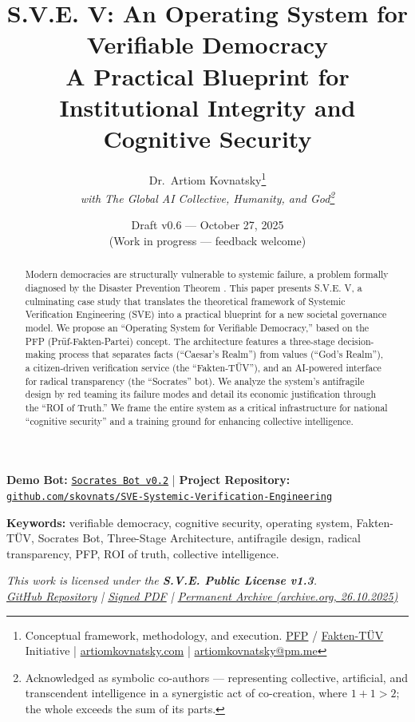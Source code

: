 \documentclass[11pt,a4paper]{article}
\title{\textbf{S.V.E. V: An Operating System for Verifiable Democracy}\\[0.5em]
\large A Practical Blueprint for Institutional Integrity and Cognitive Security}
\author{
  Dr.\ Artiom Kovnatsky\thanks{Conceptual framework, methodology, and execution. 
  \href{http://www.pfp24.de}{PFP} / 
  \href{http://www.fakten-tuev.de}{Fakten-TÜV} Initiative \;|\;
  \href{https://www.artiomkovnatsky.com/}{artiomkovnatsky.com} \;|\;
  \href{mailto:artiomkovnatsky@pm.me}{artiomkovnatsky@pm.me}}\\
  \textit{with The Global AI Collective, Humanity, and God\footnote{Acknowledged as symbolic co-authors — representing collective, artificial, and transcendent intelligence in a synergistic act of co-creation, where $1 + 1 > 2$; the whole exceeds the sum of its parts.}}
}
\date{Draft v0.6 — October 27, 2025\\
\small (Work in progress — feedback welcome)}
\begin{document}
\maketitle
\vspace{-1em}
\begin{center}
    {\small 
    \textbf{Demo Bot:} 
    \href{https://chatgpt.com/g/g-68f1fc9848948191a1cc038db8e3422b-sokrat-socrates-bot-v0-2}
    {\texttt{Socrates Bot v0.2}} 
    \quad|\quad
    \textbf{Project Repository:} 
    \href{https://codeberg.org/skovnats/SVE-Systemic-Verification-Engineering}
    {\texttt{github.com/skovnats/SVE-Systemic-Verification-Engineering}}}
\end{center}
\vspace{1em}
\thispagestyle{empty}


\begin{abstract}
\noindent Modern democracies are structurally vulnerable to systemic failure, a problem formally diagnosed by the Disaster Prevention Theorem \citep{Kovnatsky2025SVE1}. This paper presents S.V.E. V, a culminating case study that translates the theoretical framework of Systemic Verification Engineering (SVE) into a practical blueprint for a new societal governance model. We propose an ``Operating System for Verifiable Democracy,'' based on the PFP (Prüf-Fakten-Partei) concept. The architecture features a three-stage decision-making process that separates facts (``Caesar's Realm'') from values (``God's Realm''), a citizen-driven verification service (the ``Fakten-TÜV''), and an AI-powered interface for radical transparency (the ``Socrates'' bot). We analyze the system's antifragile design by red teaming its failure modes and detail its economic justification through the ``ROI of Truth.'' We frame the entire system as a critical infrastructure for national ``cognitive security'' and a training ground for enhancing collective intelligence.
\end{abstract}

\noindent\textbf{Keywords:} verifiable democracy, cognitive security, operating system, Fakten-TÜV, Socrates Bot, Three-Stage Architecture, antifragile design, radical transparency, PFP, ROI of truth, collective intelligence.

\vspace{1em}
\begin{center}
\begin{minipage}{0.85\textwidth}
\centering
\itshape\small
This work is licensed under the \textbf{S.V.E. Public License v1.3}.\\[0.3em]
\href{https://codeberg.org/skovnats/SVE-Systemic-Verification-Engineering/tree/master/License/signed}{GitHub Repository}
\quad|\quad
\href{https://codeberg.org/skovnats/SVE-Systemic-Verification-Engineering/src/branch/master/License/signed/_SVE-Systemic-Verification-Engineering_License_SIGNED.pdf}{Signed PDF}
\quad|\quad
\href{https://archive.org/details/sve_public_license_v1.3}{Permanent Archive (archive.org, 26.10.2025)}
\end{minipage}
\end{center}
\vspace{1em}
\end{document}
